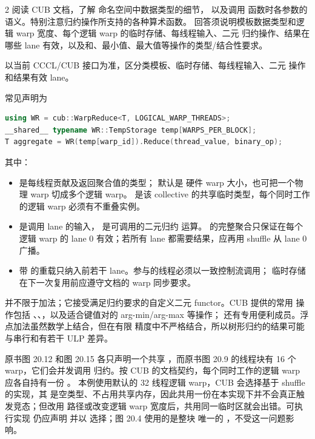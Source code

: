 \begin{solutionexercise}{2}
\problemheading 阅读 CUB 文档，了解  命名空间中数据类型的细节，
以及调用  函数时各参数的语义。特别注意归约操作所支持的各种算术函数。
回答须说明模板数据类型和逻辑 warp 宽度、每个逻辑 warp 的临时存储、每线程输入、二元
归约操作、结果在哪些 lane 有效，以及和、最小值、最大值等操作的类型/结合性要求。

\approachheading 以当前 CCCL/CUB 接口为准，区分类模板、临时存储、每线程输入、二元
操作和结果有效 lane。

\answerheading 常见声明为
\begin{lstlisting}[language=C++]
using WR = cub::WarpReduce<T, LOGICAL_WARP_THREADS>;
__shared__ typename WR::TempStorage temp[WARPS_PER_BLOCK];
T aggregate = WR(temp[warp_id]).Reduce(thread_value, binary_op);
\end{lstlisting}
其中：
\begin{itemize}
  \item {} 是每线程贡献及返回聚合值的类型； 默认是
  硬件 warp 大小，也可把一个物理 warp 切成多个逻辑 warp。 是该
  collective 的共享临时类型，每个同时工作的逻辑 warp 必须有不重叠实例。
  \item {} 是调用 lane 的输入， 是可调用的二元归约
  运算。 的完整聚合只保证在每个逻辑 warp 的 lane 0 有效；若所有 lane
  都需要结果，应再用 shuffle 从 lane 0 广播。
  \item 带  的重载只纳入前若干 lane。参与的线程必须以一致控制流调用；
  临时存储在下一次复用前应遵守文档的 warp 同步要求。
\end{itemize}

 并不限于加法；它接受满足归约要求的自定义二元 functor。CUB 提供的常用
操作包括 、、，以及适合键值对的
arg-min/arg-max 等操作； 还有专用便利成员。浮点加法虽然数学上结合，但在有限
精度中不严格结合，所以树形归约的结果可能与串行和有若干 ULP 差异。

\editorialnote 原书图 20.12 和图 20.15 各只声明一个共享
，而原书图 20.9 的线程块有 16 个 warp，它们会并发调用
归约。按 CUB 的文档契约，每个同时工作的逻辑 warp 应各自持有一份 。
本例使用默认的 32 线程逻辑 warp，CUB 会选择基于 shuffle 的实现，其 
是空类型、不占用共享内存，因此共用一份在本实现下并不会真正触发竞态；但改用
 路径或改变逻辑 warp 宽度后，共用同一临时区就会出错。可执行实现
仍应声明  并以  选择；图 20.4 使用的是整块
唯一的 ，不受这一问题影响。


\end{solutionexercise}
